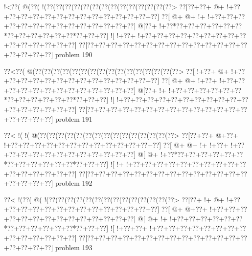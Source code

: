 \vbox{\vbox{\goo
\- !<\0??(\- @(\0??(\- !(\0??(\0??(\0??(\0??(\0??(\0??(\0??(\0??(\0??(\0??(\0??(\0??(\0??(\0??>
\0??[\0??+\0??+\- @+\- !+\0??+\0??+\0??+\0??+\0??+\0??+\0??+\0??+\0??+\0??+\0??+\0??+\0??+\0??]
\0??[\- @+\- @+\- !+\- !+\0??+\0??+\0??+\0??+\0??+\0??+\0??+\0??+\0??+\0??+\0??+\0??+\0??+\0??]
\- @[\0??+\- !+\0??*\0??+\0??+\0??+\0??+\0??+\0??*\0??+\0??+\0??+\0??+\0??+\0??*\0??+\0??+\0??]
\- ![\- !+\0??+\- !+\0??+\0??+\0??+\0??+\0??+\0??+\0??+\0??+\0??+\0??+\0??+\0??+\0??+\0??+\0??]
\0??[\0??+\0??+\0??+\0??+\0??+\0??+\0??+\0??+\0??+\0??+\0??+\0??+\0??+\0??+\0??+\0??+\0??+\0??]
}
\hfil problem 190\hfil\break
}



\vbox{\vbox{\goo
\0??<\0??(\- @(\0??(\0??(\0??(\0??(\0??(\0??(\0??(\0??(\0??(\0??(\0??(\0??(\0??(\0??(\0??(\0??>
\0??[\- !+\0??+\- @+\- !+\0??+\0??+\0??+\0??+\0??+\0??+\0??+\0??+\0??+\0??+\0??+\0??+\0??+\0??]
\0??[\- @+\- @+\- !+\0??+\- !+\0??+\0??+\0??+\0??+\0??+\0??+\0??+\0??+\0??+\0??+\0??+\0??+\0??]
\- @[\0??+\- !+\- !+\0??+\0??+\0??+\0??+\0??+\0??*\0??+\0??+\0??+\0??+\0??+\0??*\0??+\0??+\0??]
\- ![\- !+\0??+\0??+\0??+\0??+\0??+\0??+\0??+\0??+\0??+\0??+\0??+\0??+\0??+\0??+\0??+\0??+\0??]
\0??[\0??+\0??+\0??+\0??+\0??+\0??+\0??+\0??+\0??+\0??+\0??+\0??+\0??+\0??+\0??+\0??+\0??+\0??]
}
\hfil problem 191\hfil\break
}



\vbox{\vbox{\goo
\0??<\- !(\- !(\- @(\0??(\0??(\0??(\0??(\0??(\0??(\0??(\0??(\0??(\0??(\0??(\0??(\0??(\0??(\0??>
\0??[\0??+\0??+\- @+\0??+\- !+\0??+\0??+\0??+\0??+\0??+\0??+\0??+\0??+\0??+\0??+\0??+\0??+\0??]
\0??[\- @+\- @+\- !+\- !+\0??+\- !+\0??+\0??+\0??+\0??+\0??+\0??+\0??+\0??+\0??+\0??+\0??+\0??]
\- @[\- @+\- !+\0??*\0??+\0??+\0??+\0??+\0??+\0??*\0??+\0??+\0??+\0??+\0??+\0??*\0??+\0??+\0??]
\- ![\- !+\- !+\0??+\0??+\0??+\0??+\0??+\0??+\0??+\0??+\0??+\0??+\0??+\0??+\0??+\0??+\0??+\0??]
\0??[\0??+\0??+\0??+\0??+\0??+\0??+\0??+\0??+\0??+\0??+\0??+\0??+\0??+\0??+\0??+\0??+\0??+\0??]
}
\hfil problem 192\hfil\break
}



\vbox{\vbox{\goo
\0??<\- !(\0??(\- @(\- !(\0??(\0??(\0??(\0??(\0??(\0??(\0??(\0??(\0??(\0??(\0??(\0??(\0??(\0??>
\0??[\0??+\- !+\- @+\- !+\0??+\0??+\0??+\0??+\0??+\0??+\0??+\0??+\0??+\0??+\0??+\0??+\0??+\0??]
\0??[\- @+\- @+\0??+\- !+\0??+\0??+\0??+\0??+\0??+\0??+\0??+\0??+\0??+\0??+\0??+\0??+\0??+\0??]
\- @[\- @+\- !+\- !+\0??+\0??+\0??+\0??+\0??+\0??*\0??+\0??+\0??+\0??+\0??+\0??*\0??+\0??+\0??]
\- ![\- !+\0??+\0??+\- !+\0??+\0??+\0??+\0??+\0??+\0??+\0??+\0??+\0??+\0??+\0??+\0??+\0??+\0??]
\0??[\0??+\0??+\0??+\0??+\0??+\0??+\0??+\0??+\0??+\0??+\0??+\0??+\0??+\0??+\0??+\0??+\0??+\0??]
}
\hfil problem 193\hfil\break
}



